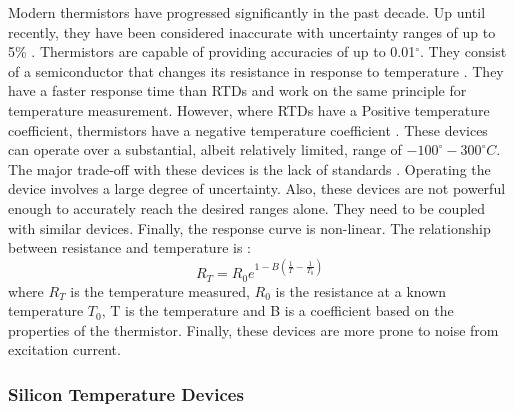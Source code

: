 Modern thermistors have progressed significantly in the past decade. Up until recently, they have been considered inaccurate with uncertainty ranges of up to 5\% \cite{tong2001improving}. Thermistors are capable of providing accuracies of up to 0.01$^\circ$. They consist of a semiconductor that changes its resistance in response to temperature \cite{childs2000review}. They have a faster response time than RTDs and work on the same principle for temperature measurement. However, where RTDs have a Positive temperature coefficient, thermistors have a negative temperature coefficient \cite{tong2001improving}. These devices can operate over a substantial, albeit relatively limited, range of $-100^\circ - 300^\circ C$. The major trade-off with these devices is the lack of standards \cite{tong2001improving}. Operating the device involves a large degree of uncertainty. Also, these devices are not powerful enough to accurately reach the desired ranges alone. They need to be coupled with similar devices. Finally, the response curve is non-linear. The  relationship between resistance and temperature is \cite{childs2000review}:
\begin{equation}
	R_T = R_0e^{1 - B(\frac{1}{T}- \frac{1}{T_0})}
\end{equation}
where $R_T$ is the temperature measured, $R_0$ is the resistance at a known temperature $T_0$, T is the temperature and B is a coefficient based on the properties of the thermistor. Finally, these devices are more prone to noise from excitation current.

\subsubsection{Silicon Temperature Devices}

